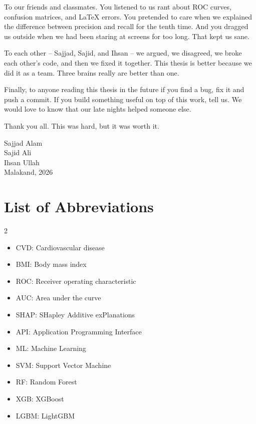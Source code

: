 \documentclass[12pt, a4paper, oneside]{book}
\begin{document}
To our friends and classmates. You listened to us rant about ROC curves, confusion matrices, and LaTeX errors. You pretended to care when we explained the difference between precision and recall for the tenth time. And you dragged us outside when we had been staring at screens for too long. That kept us sane.

To each other – Sajjad, Sajid, and Ihsan – we argued, we disagreed, we broke each other's code, and then we fixed it together. This thesis is better because we did it as a team. Three brains really are better than one.

Finally, to anyone reading this thesis in the future if you find a bug, fix it and push a commit. If you build something useful on top of this work, tell us. We would love to know that our late nights helped someone else.

Thank you all. This was hard, but it was worth it.
\par\bigskip
\begin{flushright}
Sajjad Alam\\
Sajid Ali\\
Ihsan Ullah\\
Malakand, 2026
\end{flushright}

\clearpage
{}
{}
\tableofcontents
\clearpage
{}
{}
\listoffigures
\clearpage
{}
{}
\listoftables

\clearpage
\thispagestyle{plain}

\chapter*{List of Abbreviations}
\begin{multicols}{2}
\begin{itemize}
\item CVD: Cardiovascular disease
\item BMI: Body mass index
\item ROC: Receiver operating characteristic
\item AUC: Area under the curve
\item SHAP: SHapley Additive exPlanations
\item API: Application Programming Interface
\item ML: Machine Learning
\item SVM: Support Vector Machine
\item RF: Random Forest
\item XGB: XGBoost
\item LGBM: LightGBM
\end{itemize}
\end{multicols}
\end{document}
